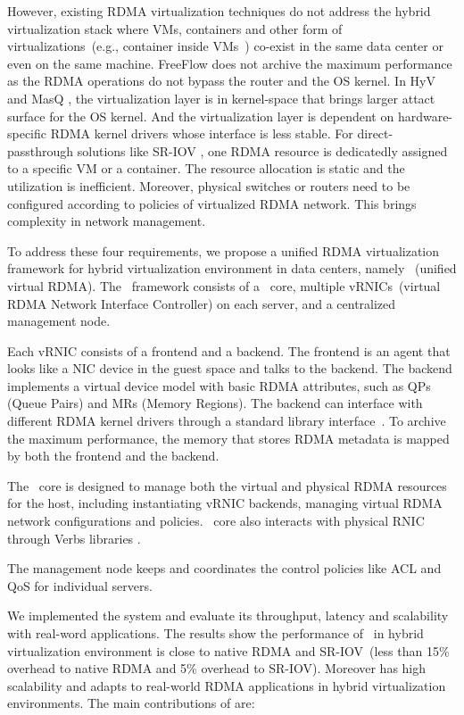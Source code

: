 However, existing RDMA virtualization techniques do not address the hybrid virtualization stack where VMs, containers and other form of virtualizations~(e.g., container inside VMs~\cite{containeronvm}) co-exist in the same data center or even on the same machine.
FreeFlow \cite{kim2019freeflow} does not archive the maximum performance as the RDMA operations do not bypass the router and the OS kernel.
In HyV \cite{pfefferle2015hybrid} and MasQ \cite{he2020masq}, the virtualization layer is in kernel-space that brings larger attact surface for the OS kernel. And the virtualization layer is dependent on hardware-specific RDMA kernel drivers whose interface is less stable. 
For direct-passthrough solutions like SR-IOV \cite{sr-iov}, one RDMA resource is dedicatedly assigned to a specific VM or a container. The resource allocation is static and the utilization is inefficient. Moreover, physical switches or routers need to be configured according to policies of virtualized RDMA network. This brings complexity in network management.

To address these four requirements, we propose a unified RDMA virtualization framework for hybrid virtualization environment in data centers, namely \sys~(unified virtual RDMA). The \sys~framework consists of a \sys~core, multiple vRNICs~(virtual RDMA Network Interface Controller) on each server, and a centralized management node.

Each vRNIC consists of a frontend and a backend. The frontend is an agent that looks like a NIC device in the guest space and talks to the backend. The backend implements a virtual device model with basic RDMA attributes, such as QPs (Queue Pairs) and MRs (Memory Regions). The backend can interface with different RDMA kernel drivers through a standard library interface~\cite{verbs}. To archive the maximum performance, the memory that stores RDMA metadata is mapped by both the frontend and the backend. 

The \sys~core is designed to manage both the virtual and physical RDMA resources for the host, including instantiating vRNIC backends, managing virtual RDMA network configurations and policies. \sys~core also interacts with physical RNIC through Verbs libraries \cite{verbs}.

The management node keeps and coordinates the control policies like ACL and QoS for individual servers.

We implemented the \sys system and evaluate its throughput, latency and scalability with real-word applications. The results show the performance of \sys~in hybrid virtualization environment is close to native RDMA and SR-IOV~(less than 15\% overhead to native RDMA and 5\% overhead to SR-IOV). Moreover \sys has high scalability and adapts to real-world RDMA applications in hybrid virtualization environments. The main contributions of \sys are:

